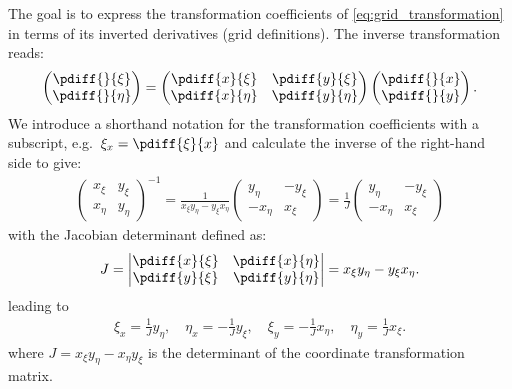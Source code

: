 The goal is to express the transformation coefficients of \autoref{eq:grid_transformation} in terms of its inverted derivatives (grid definitions).
The inverse transformation reads:
%
\begin{align}\label{}
    \begin{pmatrix} \pdiff{}{\xi} \\ \pdiff{}{\eta} \end{pmatrix}
    =
    \begin{pmatrix}
        \pdiff{x}{\xi} &
        \pdiff{y}{\xi} \\
        \pdiff{x}{\eta} &
        \pdiff{y}{\eta}
    \end{pmatrix}
    \begin{pmatrix} \pdiff{}{x} \\ \pdiff{}{y} \end{pmatrix}.
    \label{eq:inverse_grid_transformation}
\end{align}
%
We introduce a shorthand notation for the transformation coefficients with a subscript, e.g.\ $\xi_x = \pdiff{\xi}{x}$ and calculate the inverse of the right-hand side to give:
%
\begin{align}
	\begin{pmatrix}
		x_\xi &
		y_\xi \\
		x_\eta &
		y_\eta
	\end{pmatrix}^{-1}
	=
	\frac{1}{x_{\xi}y_{\eta}-y_{\xi}x_{\eta}}
	\begin{pmatrix}
		y_{\eta} &
		-y_{\xi}\\
		-x_{\eta} &
		x_{\xi}
	\end{pmatrix}
	=
	\frac{1}{J}
	\begin{pmatrix}
		y_{\eta} &
		-y_{\xi}\\
		-x_{\eta} &
		x_{\xi}
	\end{pmatrix}
    \label{eq:inverse_transformation}
\end{align}
with the Jacobian determinant defined as:
\begin{align}
J =
\begin{vmatrix}
    \pdiff{x}{\xi} & \pdiff{x}{\eta} \\
    \pdiff{y}{\xi} & \pdiff{y}{\eta}
\end{vmatrix}
= x_{\xi}y_{\eta}-y_{\xi}x_{\eta}.
\end{align}
leading to
\begin{align}
	\xi_x=\frac{1}{J}y_{\eta}, \quad \eta_x = -\frac{1}{J}y_{\xi}, \quad
	\xi_y=-\frac{1}{J}x_{\eta}, \quad \eta_y = \frac{1}{J}x_{\xi}.
    \label{eq:inverse_transformation_1}
\end{align}
where $J = x_{\xi}y_{\eta}-x_{\eta}y_{\xi}$ is the determinant of the coordinate transformation matrix.

